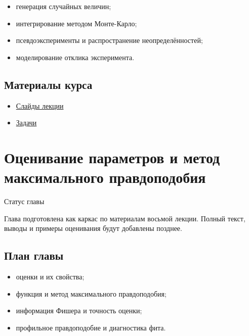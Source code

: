 \documentclass[
  russian,
  letterpaper,
]{scrbook}
\providecommand{\tightlist}{%
  \setlength{\itemsep}{0pt}\setlength{\parskip}{0pt}}
\begin{document}
\begin{itemize}
\tightlist
\item
  генерация случайных величин;
\item
  интегрирование методом Монте-Карло;
\item
  псевдоэксперименты и распространение неопределённостей;
\item
  моделирование отклика эксперимента.
\end{itemize}

\section{Материалы
курса}\label{ux43cux430ux442ux435ux440ux438ux430ux43bux44b-ux43aux443ux440ux441ux430-4}

\begin{itemize}
\tightlist
\item
  \href{https://neutrinohit.github.io/statistical-analysis-course/ru/slides/06_monte_carlo_method.html}{Слайды
  лекции}
\item
  \href{https://neutrinohit.github.io/statistical-analysis-course/ru/slides/exercises/06_monte_carlo_method_exercises.html}{Задачи}
\end{itemize}

\chapter{Оценивание параметров и метод максимального
правдоподобия}\label{ux43eux446ux435ux43dux438ux432ux430ux43dux438ux435-ux43fux430ux440ux430ux43cux435ux442ux440ux43eux432-ux438-ux43cux435ux442ux43eux434-ux43cux430ux43aux441ux438ux43cux430ux43bux44cux43dux43eux433ux43e-ux43fux440ux430ux432ux434ux43eux43fux43eux434ux43eux431ux438ux44f}

{Статус главы}

Глава подготовлена как каркас по материалам восьмой лекции. Полный
текст, выводы и примеры оценивания будут добавлены позднее.

\section{План
главы}\label{ux43fux43bux430ux43d-ux433ux43bux430ux432ux44b-6}

\begin{itemize}
\tightlist
\item
  оценки и их свойства;
\item
  функция и метод максимального правдоподобия;
\item
  информация Фишера и точность оценки;
\item
  профильное правдоподобие и диагностика фита.
\end{itemize}
\end{document}

